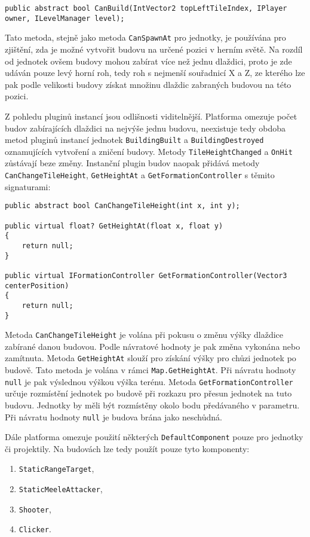 \begin{lstlisting}
public abstract bool CanBuild(IntVector2 topLeftTileIndex, IPlayer owner, ILevelManager level);
\end{lstlisting}

Tato metoda, stejně jako metoda \texttt{CanSpawnAt} pro jednotky, je používána pro zjištění, zda je možné vytvořit budovu na určené pozici v herním světě. Na rozdíl od jednotek ovšem budovy mohou zabírat více než jednu dlaždici, proto je zde udáván pouze levý horní roh, tedy roh s nejmenší souřadnicí X a Z, ze kterého lze pak podle velikosti budovy získat množinu dlaždic zabraných budovou na této pozici. 


Z pohledu pluginů instancí jsou odlišnosti viditelnější. Platforma omezuje počet budov zabírajících dlaždici na nejvýše jednu budovu, neexistuje tedy obdoba metod pluginů instancí jednotek \texttt{BuildingBuilt} a \texttt{BuildingDestroyed} oznamujících vytvoření a zničení budovy. Metody \texttt{TileHeightChanged} a \texttt{OnHit} zůstávají beze změny. Instanční plugin budov naopak přidává metody \texttt{CanChangeTileHeight}, \texttt{GetHeightAt} a \texttt{GetFormationController} s těmito signaturami:

\begin{lstlisting}
public abstract bool CanChangeTileHeight(int x, int y);

public virtual float? GetHeightAt(float x, float y)
{
	return null;
}

public virtual IFormationController GetFormationController(Vector3 centerPosition)
{
	return null;
}
\end{lstlisting}

Metoda \texttt{CanChangeTileHeight} je volána při pokusu o změnu výšky dlaždice zabírané danou budovou. Podle návratové hodnoty je pak změna vykonána nebo zamítnuta. Metoda \texttt{GetHeightAt} slouží pro získání výšky pro chůzi jednotek po budově. Tato metoda je volána v rámci \texttt{Map.GetHeightAt}. Při návratu hodnoty \texttt{null} je pak výslednou výškou výška terénu. Metoda \texttt{GetFormationController} určuje rozmístění jednotek po budově při rozkazu pro přesun jednotek na tuto budovu. Jednotky by měli být rozmístěny okolo bodu předávaného v parametru. Při návratu hodnoty \texttt{null} je budova brána jako neschůdná.


Dále platforma omezuje použití některých \texttt{DefaultComponent} pouze pro jednotky či projektily. Na budovách lze tedy použít pouze tyto komponenty:
\begin{enumerate}
	\item \texttt{StaticRangeTarget},
	\item \texttt{StaticMeeleAttacker},
	\item \texttt{Shooter},
	\item \texttt{Clicker}.
\end{enumerate}

